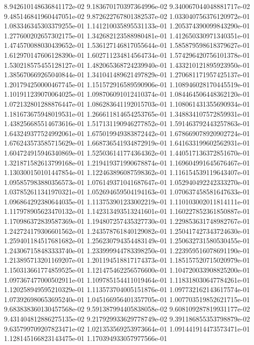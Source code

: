 8.942610148636841172e-02
9.183670170397364996e-02
9.340067044048881717e-02
9.485146841960447051e-02
9.872622767801382537e-02
1.033040756376120972e-01
1.083346345303379255e-01
1.141210035895531133e-01
1.205374390099843290e-01
1.277600202657302175e-01
1.342682123588980481e-01
1.412650330971340351e-01
1.474570088030439652e-01
1.536127146817055644e-01
1.585879598618379627e-01
1.612970147606128390e-01
1.602711234814564734e-01
1.574296420756101378e-01
1.530218575455128127e-01
1.482065368724239940e-01
1.433210121895923950e-01
1.385670669265040844e-01
1.341041489621497829e-01
1.270681171957425137e-01
1.201794250000467745e-01
1.151572916589590906e-01
1.108946028170445519e-01
1.101911239070064025e-01
1.098706091012410374e-01
1.084464506448362120e-01
1.072132801288876447e-01
1.086283641192015703e-01
1.108061431355690934e-01
1.181673675948019531e-01
1.266611814654253765e-01
1.348834107572859931e-01
1.438256685514673616e-01
1.517131190946277852e-01
1.591463792443257863e-01
1.643249377524992061e-01
1.675019949383872442e-01
1.678669078920902724e-01
1.676243573585715629e-01
1.668736541934872919e-01
1.641633199602562931e-01
1.604724915946340869e-01
1.525036141774364362e-01
1.440517136372851670e-01
1.321871582613799168e-01
1.219419371990678874e-01
1.169604991645676467e-01
1.130300150101447854e-01
1.122463896087598362e-01
1.116154539119643407e-01
1.095857983880356573e-01
1.076149371041687647e-01
1.052940492242333270e-01
1.037852611341970321e-01
1.052694659504194163e-01
1.070637458581647633e-01
1.096864292380644035e-01
1.113753901233002219e-01
1.110103002011814111e-01
1.117978905623470132e-01
1.142313493513241601e-01
1.160227852361850887e-01
1.170986372839587369e-01
1.194807257435327730e-01
1.229853631748982767e-01
1.242724179306601562e-01
1.243578761840129082e-01
1.250417427343724630e-01
1.259401184517681682e-01
1.256230794354483149e-01
1.250632731580530455e-01
1.243067158483333740e-01
1.233999944783398250e-01
1.223959516078691190e-01
1.213895713201169207e-01
1.201194518817174373e-01
1.185157520715020979e-01
1.150313661774859525e-01
1.121475462256576600e-01
1.104720033908825200e-01
1.097367477000502911e-01
1.109785154411019464e-01
1.118318030647784261e-01
1.120258949595210329e-01
1.113573704005151876e-01
1.097732162143617574e-01
1.073926980653695240e-01
1.045166956401357705e-01
1.007703519852621715e-01
9.683838360130457568e-02
9.591387994405838058e-02
9.608109287819931177e-02
9.431404812886275135e-02
9.217929933629778749e-02
9.391186855353798879e-02
9.635799709207823471e-02
1.021353569253973664e-01
1.091441914473573471e-01
1.128145166823143475e-01
1.170394933057977566e-01
